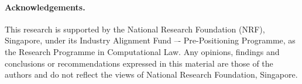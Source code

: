 \documentclass[runningheads]{llncs}
\begin{document}


\paragraph{Acknowledgements.}
This research is supported by the National Research Foundation (NRF),
Singapore, under its Industry Alignment Fund –- Pre-Positioning Programme, as
the Research Programme in Computational Law. Any opinions, findings and
conclusions or recommendations expressed in this material are those of the
authors and do not reflect the views of National Research Foundation,
Singapore.

% 
% 


\end{document}
